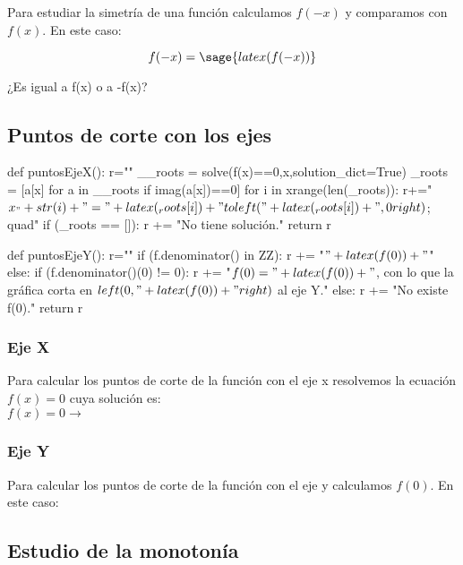 \ifverbose
    Para estudiar la simetría de una función calculamos $f(-x)$ y comparamos con $f(x)$. 
    En este caso:
\fi

\[f(-x) = \sage{latex(f(-x))}\]

¿Es igual a f(x) o a -f(x)? 

\subsection{Puntos de corte con los ejes}
\begin{sagesilent}
def puntosEjeX():
    r=""
    __roots = solve(f(x)==0,x,solution_dict=True)
    _roots = [a[x] for a in __roots if imag(a[x])==0]
    for i in xrange(len(_roots)):
        r+="$x_"+str(i)+" = "+latex(_roots[i])+"\\to \\left("+latex(_roots[i])+",0\\right)$;\\quad"
    if (_roots == []):
        r += "No tiene solución."
    return r

def puntosEjeY():
    r=""
    if (f.denominator() in ZZ):
        r += "$" + latex(f(0)) +"$"
    else:
        if (f.denominator()(0) != 0):
            r += "$f(0) = " + latex(f(0)) + "$, con lo que la gráfica corta en $\\left(0,"+latex(f(0)) + "\\right)$ al eje Y."   
        else:
            r +=  "No existe f(0)."    
    return r

\end{sagesilent}

\subsubsection{Eje X}
\ifverbose
Para calcular los puntos de corte de la función con el eje x resolvemos la ecuación $f(x) = 0$ cuya solución es: 
\\

\else 
$f(x) = 0\rightarrow $
\fi
{} 

\subsubsection{Eje Y}
\ifverbose
Para calcular los puntos de corte de la función con el eje y calculamos $f(0)$. 
%
En este caso:
\fi
{}


\subsection{Estudio de la monotonía}

